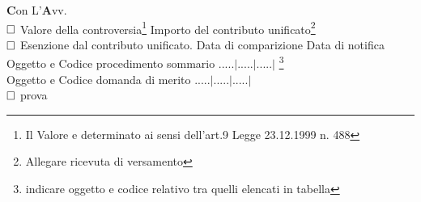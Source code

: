 \documentclass{article}
\begin{document}
\textbf{C}\tiny{on L'}\textbf{A}\tiny{vv.} \vspace*{1cm}
\\
\normalsize$\text{\rlap{}}\square$ Valore della controversia\footnote{Il Valore e determinato ai sensi dell'art.9 Legge 23.12.1999 n. 488 }
Importo del contributo unificato\footnotemark[1]\footnote{Allegare ricevuta di versamento}
\vspace{1cm} \\
$\text{\rlap{}}\square$ Esenzione dal contributo unificato.\newpage
Data di comparizione 
%
 Data di notifica 
Oggetto e Codice  procedimento sommario \hrulefill  .....$ | $.....$ | $.....$ | $ \footnote{indicare oggetto e codice relativo tra quelli elencati in tabella}\\
Oggetto e Codice domanda di merito \hrulefill .....$ | $.....$ | $.....$ | $\footnotemark[3] \\

$\text{\rlap{}}\square$ prova
\end{document}
